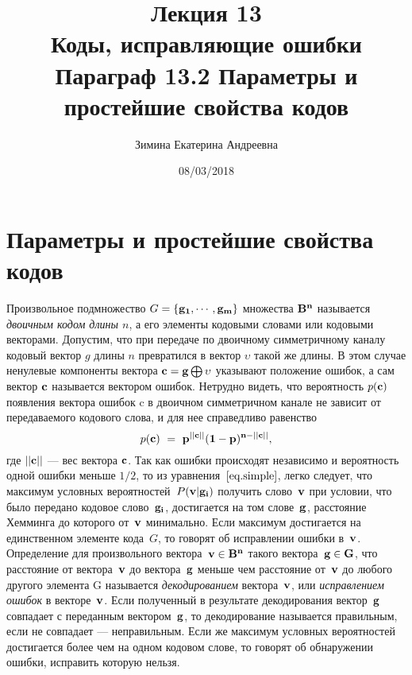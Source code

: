 \documentclass[12pt]{article}
\date{}
\title{\bf Лекция 13\\
Коды, исправляющие ошибки\\
Параграф 13.2 Параметры и простейшие свойства кодов\\}
\author{Зимина Екатерина Андреевна}
\date{08/03/2018}
\numberwithin{equation}{section}
\begin{document}
 
\maketitle
\newpage
\tableofcontents
\newpage
\section{ Параметры и простейшие свойства кодов}

Произвольное подмножество $G = \{{\bf {g}_1,\cdots,\bf {g}_m}\}$ множества $\bf{B}^n$ называется {\it двоичным кодом длины $n$}, а его элементы кодовыми словами или кодовыми векторами. Допустим, что при передаче по двоичному симметричному каналу кодовый вектор $g$ длины $n$ превратился в вектор $\upsilon$ такой же длины. В этом случае ненулевые компоненты вектора $\bf{c} = \bf{g}\bigoplus {\bf\upsilon}$ указывают положение ошибок, а сам вектор $\bf{c}$ называется вектором ошибок. Нетрудно видеть, что вероятность $p(\bf{c})$ появления вектора ошибок c в двоичном симметричном канале не зависит от передаваемого кодового слова, и для нее справедливо равенство 
\begin{equation}
p(\bf{c})~=~p^{||\bf{c}||}(1-p)^{n-||\bf c||},
\label{eq.simple} 
\end{equation}
где $||\bf{c}||$ — вес вектора $\bf{c}$. Так как ошибки происходят независимо и вероятность одной ошибки меньше $1/2$, то из уравнения~$\eqref{eq.simple}$, легко следует, что максимум условных вероятностей~$P(\bf{v}|\bf{g}_i)$ получить слово~$\bf v$ при условии, что было передано кодовое слово~$\bf{g}_i$, достигается на том слове~$\bf{g}$, расстояние Хемминга до которого от~$\bf v$ минимально. Если максимум достигается на единственном элементе кода~$G$, то говорят об исправлении ошибки в~$\bf v$. Определение для произвольного вектора~$\bf{v} \in B^n$ такого вектора~$\bf{g} \in G$, что расстояние от вектора~$\bf v$ до вектора~$\bf g$  меньше чем расстояние от~$\bf v$ до любого другого элемента G называется {\it декодированием} вектора~$\bf v$, или {\it исправлением ошибок} в векторе~$\bf v$. Если полученный в результате декодирования вектор~$\bf{g}$ совпадает с переданным вектором~$\bf{g}$, то декодирование называется правильным, если не совпадает — неправильным. Если же максимум условных вероятностей достигается более чем на одном кодовом слове, то говорят об обнаружении ошибки, исправить которую нельзя.
\end{document}

